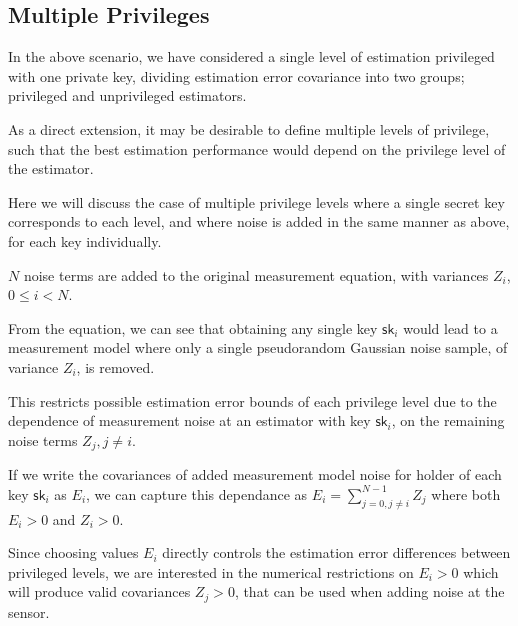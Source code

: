 \documentclass[conference]{IEEEtran}
\theoremstyle{definition}
\theoremstyle{definition}
\theoremstyle{remark}
\begin{document}
% 
% 

\subsection{Multiple Privileges}
In the above scenario, we have considered a single level of estimation privileged with one private key, dividing estimation error covariance into two groups; privileged and unprivileged estimators.

As a direct extension, it may be desirable to define multiple levels of privilege, such that the best estimation performance would depend on the privilege level of the estimator.

Here we will discuss the case of multiple privilege levels where a single secret key corresponds to each level, and where noise is added in the same manner as above, for each key individually.

$N$ noise terms are added to the original measurement equation, with variances $Z_i$, $0 \leq i < N$.

From the equation, we can see that obtaining any single key $\mathsf{sk}_i$ would lead to a measurement model where only a single pseudorandom Gaussian noise sample, of variance $Z_i$, is removed.

This restricts possible estimation error bounds of each privilege level due to the dependence of measurement noise at an estimator with key $\mathsf{sk}_i$, on the remaining noise terms $Z_j,j \neq i$.

If we write the covariances of added measurement model noise for holder of each key $\mathsf{sk}_i$ as $E_i$, we can capture this dependance as $E_i=\sum^{N-1}_{j=0,j \neq i}Z_j$ where both $E_i>0$ and $Z_i>0$.

Since choosing values $E_i$ directly controls the estimation error differences between privileged levels, we are interested in the numerical restrictions on $E_i>0$ which will produce valid covariances $Z_j>0$, that can be used when adding noise at the sensor.
\end{document}
